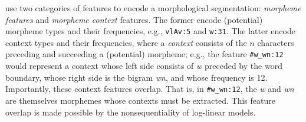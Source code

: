 \cite{poon-et-al:2009} use two categories of features to encode a morphological segmentation: \textit{morpheme features} and \textit{morpheme context} features.
The former encode (potential) morpheme types and their frequencies, e.g., \texttt{vlAv:5} and \texttt{w:31}. The 
latter encode context types and their frequencies, where a \emph{context} consists of the $n$ characters preceding and succeeding a (potential) morpheme;
e.g., the feature \texttt{\#w\_wn:12} would represent a context whose left side consists of \textit{w} preceded by the word boundary, whose right side is the bigram \textit{wn}, and whose frequency is 12. Importantly, these context features overlap. That is, in \texttt{\#w\_wn:12}, the \textit{w} and \textit{wn} are themselves morphemes whose contexts must be extracted.
This feature overlap is made possible by the nonsequentiality of log-linear models.

